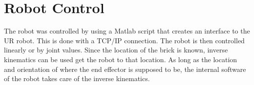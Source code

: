 \section{Robot Control}
The robot was controlled by using a Matlab script that creates an interface to the UR robot. This is done with a TCP/IP connection. The robot is then controlled linearly or by joint values. Since the location of the brick is known, inverse kinematics can be used get the robot to that location.  As long as the location and orientation of where the end effector is supposed to be, the internal software of the robot takes care of the inverse kinematics.